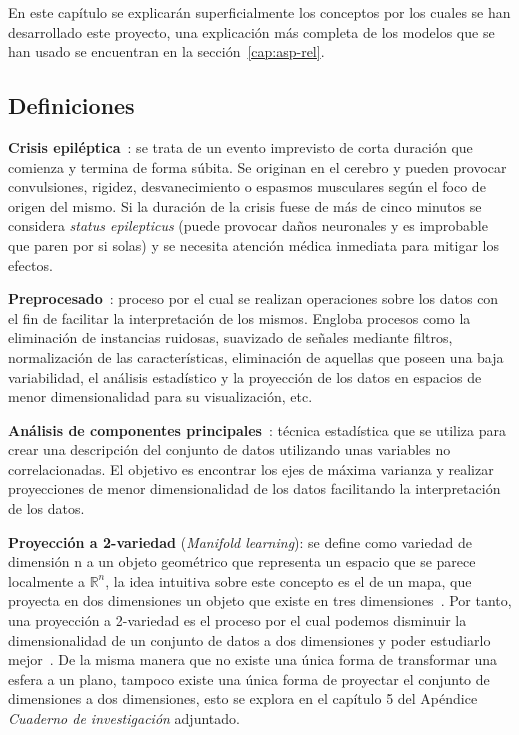 
En este capítulo se explicarán superficialmente los conceptos por los cuales se han desarrollado este proyecto, una explicación más completa de los modelos que se han usado se encuentran en la sección~\ref{cap:asp-rel}.

\subsection{Definiciones}

\textbf{Crisis epiléptica}~\cite{epilepsia}: se trata de un evento imprevisto de corta duración que comienza y termina de forma súbita. Se originan en el cerebro y pueden provocar convulsiones, rigidez, desvanecimiento o espasmos musculares según el foco de origen del mismo. Si la duración de la crisis fuese de más de cinco minutos se considera \textit{status epilepticus} (puede provocar daños neuronales y es improbable que paren por si solas) y se necesita atención médica inmediata para mitigar los efectos.

\textbf{Preprocesado}~\cite{ubu:mineria1}: proceso por el cual se realizan operaciones sobre los datos con el fin de facilitar la interpretación de los mismos. Engloba procesos como la eliminación de instancias ruidosas, suavizado de señales mediante filtros, normalización de las características, eliminación de aquellas que poseen una baja variabilidad, el análisis estadístico y la proyección de los datos en espacios de menor dimensionalidad para su visualización, etc.

\textbf{Análisis de componentes principales}~\cite{wiki:pca}: técnica estadística que se utiliza para crear una descripción del conjunto de datos utilizando unas variables no correlacionadas. El objetivo es encontrar los ejes de máxima varianza y realizar proyecciones de menor dimensionalidad de los datos facilitando la interpretación de los datos.

\textbf{Proyección a 2-variedad} (\textit{Manifold learning}): se define como variedad de dimensión n a un objeto geométrico que representa un espacio que se parece localmente a $\mathbb{R}^n$, la idea intuitiva sobre este concepto es el de un mapa, que proyecta en dos dimensiones un objeto que existe en tres dimensiones~\cite{wiki:manifold}. Por tanto, una proyección a 2-variedad es el proceso por el cual podemos disminuir la dimensionalidad de un conjunto de datos a dos dimensiones y poder estudiarlo mejor~\cite{tool:scikit-learn}. De la misma manera que no existe una única forma de transformar una esfera a un plano, tampoco existe una única forma de proyectar el conjunto de dimensiones a dos dimensiones, esto se explora en el capítulo 5 del Apéndice \textit{Cuaderno de investigación} adjuntado.

